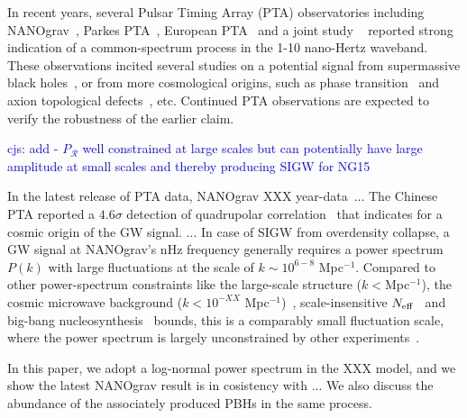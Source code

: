 \documentclass[aps, 10pt, preprintnumbers, prd, amsmath, amssymb,twocolumn, notitlepage, nofootinbib]{revtex4} %
\newcommand{\neff}{N_{\rm{eff}}}
\newcommand{\ps}{P_{\mathcal{R}}}
\newcommand{\ck}[1]{\textcolor{blue}{#1}}
\begin{document}
In recent years, several Pulsar Timing Array (PTA) observatories including NANOgrav~\cite{NANOGrav:2020bcs}, Parkes PTA~\cite{Goncharov:2021oub}, European PTA~\cite{Chen:2021rqp} and a joint study ~\cite{Antoniadis:2022pcn} reported strong indication of a common-spectrum process in the 1-10 nano-Hertz waveband. 
These observations incited several studies on a potential signal from supermassive black holes~\cite{Middleton:2020asl}, or from more cosmological origins, such as phase transition~\cite{Bian:2020urb,NANOGrav:2021flc,Xue:2021gyq,Wang:2022wwj} and axion topological defects~\cite{Wang:2022rjz,Ferreira:2022zzo}, etc. Continued PTA observations are expected to verify the robustness of the earlier claim. 

\ck{cjs: add - $\ps$ well constrained at large scales but can potentially have large amplitude at small scales and thereby producing SIGW for NG15}

In the latest release of PTA data, NANOgrav XXX year-data~\cite{}... The Chinese PTA reported a $4.6\sigma$ detection of quadrupolar correlation~\cite{Xu_2023} that indicates for a cosmic origin of the GW signal. ... In case of SIGW from overdensity collapse, a GW signal at NANOgrav's nHz frequency generally requires a power spectrum $P(k)$ with large fluctuations at the scale of $k\sim 10^{6-8}$ Mpc$^{-1}$. Compared to other power-spectrum constraints like the large-scale structure ($k<$Mpc$^{-1}$), the cosmic microwave background ($k< 10^{-XX}$ Mpc$^{-1}$)~\cite{Hunt:2015iua}, scale-insensitive $N_{\rm eff}$~\cite{PLK2015,Cang:2022jyc} and big-bang nucleosynthesis~\cite{Kohri:2018awv,Inomata:2018epa} bounds, this is a comparably small  fluctuation scale, where the power spectrum is largely unconstrained by other experiments~\cite{}. 

In this paper, we adopt a log-normal power spectrum in the XXX model, and we show the latest NANOgrav result is in cosistency with ... We also discuss the abundance of the associately produced PBHs in the same process.



\end{document}

